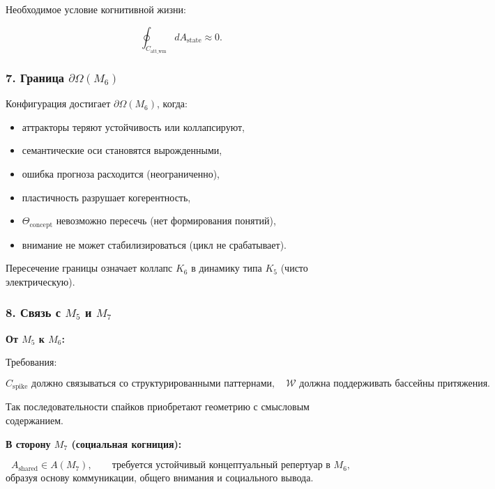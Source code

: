 Необходимое условие когнитивной жизни:

\[
\oint_{C_{\mathrm{att\_wm}}} dA_{\mathrm{state}} \approx 0.
\]

\subsubsection*{7. Граница \texorpdfstring{$\partial\Omega(M_6)$}{\partial\Omega(M_6)}}

Конфигурация достигает $\partial\Omega(M_6)$, когда:

\begin{itemize}
    \item аттракторы теряют устойчивость или коллапсируют,
    \item семантические оси становятся вырожденными,
    \item ошибка прогноза расходится (неограниченно),
    \item пластичность разрушает когерентность,
    \item $\Theta_{\mathrm{concept}}$ невозможно пересечь (нет формирования понятий),
    \item внимание не может стабилизироваться (цикл не срабатывает).
\end{itemize}

Пересечение границы означает коллапс $K_6$ в динамику типа $K_5$ (чисто электрическую).

\subsubsection*{8. Связь с \texorpdfstring{$M_5$}{M_5} и \texorpdfstring{$M_7$}{M_7}}

\textbf{От $M_5$ к $M_6$:}

Требования:

\[
C_{\mathrm{spike}} \text{ должно связываться со структурированными паттернами},
\quad
\mathcal{W} \text{ должна поддерживать бассейны притяжения}.
\]

Так последовательности спайков приобретают геометрию с смысловым содержанием.

\textbf{В сторону $M_7$ (социальная когниция):}

\[
A_{\mathrm{shared}} \in A(M_7),
\qquad
\text{требуется устойчивый концептуальный репертуар в } M_6,
\]
образуя основу коммуникации, общего внимания и социального вывода.
